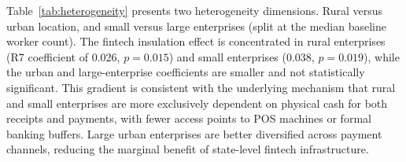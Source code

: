 Table~\ref{tab:heterogeneity} presents two heterogeneity dimensions. Rural
versus urban location, and small versus large enterprises (split at the median
baseline worker count). The fintech insulation effect is concentrated in rural
enterprises (R7 coefficient of 0.026, $p = 0.015$) and small enterprises
(0.038, $p = 0.019$), while the urban and large-enterprise coefficients are
smaller and not statistically significant. This gradient is consistent with
the underlying mechanism that rural and small enterprises are more exclusively
dependent on physical cash for both receipts and payments, with fewer access
points to POS machines or formal banking buffers. Large urban enterprises
are better diversified across payment channels, reducing the marginal benefit
of state-level fintech infrastructure.

\begin{table}[H]
\caption{Heterogeneity by Location and Firm Size}
\label{tab:heterogeneity}

\end{table}
